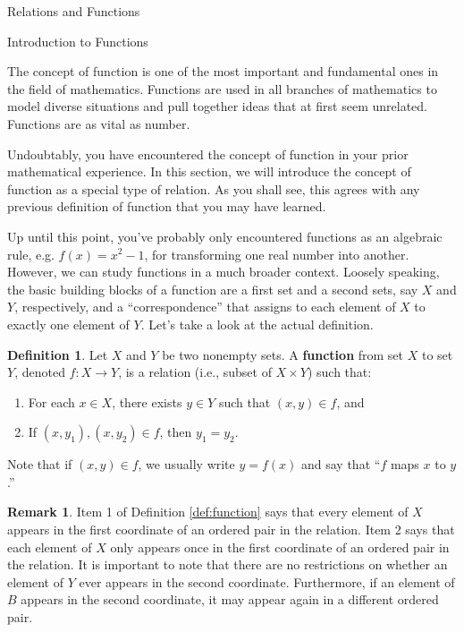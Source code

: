 \documentclass[11pt]{article}
\theoremstyle{definition}
\newtheorem{definition}[theorem]{Definition}
\newtheorem{remark}[theorem]{Remark}
\begin{document}
\addtocounter{section}{2}

\begin{section}{Relations and Functions}

\addtocounter{subsection}{3}
\addtocounter{theorem}{67}

\begin{subsection}{Introduction to Functions}

The concept of function is one of the most important and fundamental ones in the field of mathematics.  Functions are used in all branches of mathematics to model diverse situations and pull together ideas that at first seem unrelated.  Functions are as vital as number.

Undoubtably, you have encountered the concept of function in your prior mathematical experience.  In this section, we will introduce the concept of function as a special type of relation.  As you shall see, this agrees with any previous definition of function that you may have learned.  

Up until this point, you've probably only encountered functions as an algebraic rule, e.g. $f(x)=x^{2}-1$, for transforming one real number into another.  However, we can study functions in a much broader context.  Loosely speaking, the basic building blocks of a function are a first set and a second sets, say $X$ and $Y$, respectively, and a ``correspondence'' that assigns to each element of $X$ to exactly one element of $Y$.  Let's take a look at the actual definition.

\begin{definition}
Let $X$ and $Y$ be two nonempty sets.  A \textbf{function} from set $X$ to set $Y$, denoted $f:X\to Y$, is a relation (i.e., subset of $X\times Y$) such that:

\begin{enumerate}\label{def:function}
\item For each $x\in X$, there exists $y\in Y$ such that $(x,y)\in f$, and
\item If $(x,y_{1}), (x,y_{2}) \in f$, then $y_{1}=y_{2}$.
\end{enumerate}
Note that if $(x,y)\in f$, we usually write $y=f(x)$ and say that ``$f$ maps $x$ to $y$.''
\end{definition}

\begin{remark}
Item 1 of Definition \ref{def:function} says that every element of $X$ appears in the first coordinate of an ordered pair in the relation.  Item 2 says that each element of $X$ only appears once in the first coordinate of an ordered pair in the relation.  It is important to note that there are no restrictions on whether an element of $Y$ ever appears in the second coordinate.  Furthermore, if an element of $B$ appears in the second coordinate, it may appear again in a different ordered pair.
\end{remark}


\end{subsection}
\end{section}
\end{document}
